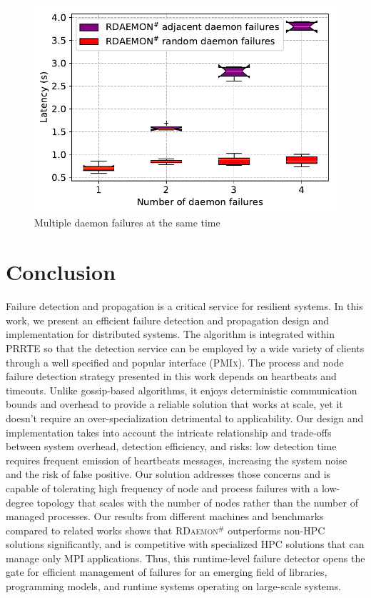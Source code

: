 \documentclass[sigconf]{acmart}
\newcommand{\prrte}[0]{\textsc{PRRTE}\xspace}
\newcommand{\pmix}[0]{\textsc{PMIx}\xspace}
\newcommand{\mpi}[0]{\textsc{MPI}\xspace}
\newcommand{\ourwork}[0]{\textsc{RDaemon}\ensuremath{^\#}\xspace}
\begin{document}
\begin{figure}[h]
  \centering
  \includegraphics[width=\linewidth]{multi_daemon_failures.pdf}
  \caption{Multiple daemon failures at the same time}
  \label{fig:multi_daemon_failure_nacl}
\end{figure}


\section{Conclusion}\label{sec:conclusion}
Failure detection and propagation is a critical service for resilient systems. In this work, we present an efficient failure detection and propagation design and implementation for distributed systems.
The algorithm is integrated within \prrte so that the detection service
can be employed by a wide variety of clients through a well specified and
popular interface (\pmix). The process and node failure detection strategy presented in this work depends on heartbeats and timeouts. Unlike gossip-based algorithms,
it enjoys deterministic communication bounds and overhead to provide a reliable solution that works at scale,
yet it doesn't require an over-specialization detrimental to applicability.
Our design and implementation takes into account the intricate relationship and trade-offs between system overhead, detection efficiency, and risks: low detection time requires frequent emission of heartbeats messages, increasing the system noise and the risk of false positive. Our solution addresses those concerns and is capable of tolerating high frequency of node and process failures with a low-degree
topology that scales with the number of nodes rather than the number of
managed processes. Our results from different machines and benchmarks
compared to related works shows that \ourwork outperforms non-HPC solutions
significantly, and is competitive with specialized HPC solutions that can
manage only \mpi applications. Thus, this runtime-level failure detector
opens the gate for efficient management of failures for an emerging field
of libraries, programming models, and runtime systems operating on large-scale systems.
\end{document}
